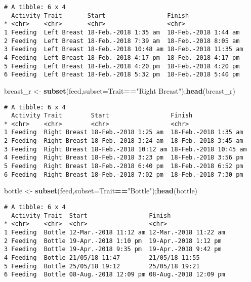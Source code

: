 \documentclass[10,portrait]{article}
\newenvironment{Shaded}{\begin{snugshade}}{\end{snugshade}}
\newcommand{\KeywordTok}[1]{\textcolor[rgb]{0.13,0.29,0.53}{\textbf{#1}}}
\newcommand{\DataTypeTok}[1]{\textcolor[rgb]{0.13,0.29,0.53}{#1}}
\newcommand{\StringTok}[1]{\textcolor[rgb]{0.31,0.60,0.02}{#1}}
\newcommand{\OperatorTok}[1]{\textcolor[rgb]{0.81,0.36,0.00}{\textbf{#1}}}
\newcommand{\NormalTok}[1]{#1}
\begin{document}
\begin{verbatim}
# A tibble: 6 x 4
  Activity Trait       Start                 Finish               
* <chr>    <chr>       <chr>                 <chr>                
1 Feeding  Left Breast 18-Feb.-2018 1:35 am  18-Feb.-2018 1:44 am 
2 Feeding  Left Breast 18-Feb.-2018 7:39 am  18-Feb.-2018 8:05 am 
3 Feeding  Left Breast 18-Feb.-2018 10:48 am 18-Feb.-2018 11:35 am
4 Feeding  Left Breast 18-Feb.-2018 4:17 pm  18-Feb.-2018 4:17 pm 
5 Feeding  Left Breast 18-Feb.-2018 4:20 pm  18-Feb.-2018 4:20 pm 
6 Feeding  Left Breast 18-Feb.-2018 5:32 pm  18-Feb.-2018 5:40 pm 
\end{verbatim}

\begin{Shaded}
\begin{Highlighting}[]
\NormalTok{breast_r <-}\StringTok{ }\KeywordTok{subset}\NormalTok{(feed,}\DataTypeTok{subset=}\NormalTok{Trait}\OperatorTok{==}\StringTok{"Right Breast"}\NormalTok{);}\KeywordTok{head}\NormalTok{(breast_r)}
\end{Highlighting}
\end{Shaded}

\begin{verbatim}
# A tibble: 6 x 4
  Activity Trait        Start                 Finish               
* <chr>    <chr>        <chr>                 <chr>                
1 Feeding  Right Breast 18-Feb.-2018 1:25 am  18-Feb.-2018 1:35 am 
2 Feeding  Right Breast 18-Feb.-2018 3:24 am  18-Feb.-2018 3:45 am 
3 Feeding  Right Breast 18-Feb.-2018 10:12 am 18-Feb.-2018 10:45 am
4 Feeding  Right Breast 18-Feb.-2018 3:23 pm  18-Feb.-2018 3:56 pm 
5 Feeding  Right Breast 18-Feb.-2018 6:40 pm  18-Feb.-2018 6:52 pm 
6 Feeding  Right Breast 18-Feb.-2018 7:02 pm  18-Feb.-2018 7:30 pm 
\end{verbatim}

\begin{Shaded}
\begin{Highlighting}[]
\NormalTok{bottle <-}\StringTok{ }\KeywordTok{subset}\NormalTok{(feed,}\DataTypeTok{subset=}\NormalTok{Trait}\OperatorTok{==}\StringTok{"Bottle"}\NormalTok{);}\KeywordTok{head}\NormalTok{(bottle)}
\end{Highlighting}
\end{Shaded}

\begin{verbatim}
# A tibble: 6 x 4
  Activity Trait  Start                 Finish               
* <chr>    <chr>  <chr>                 <chr>                
1 Feeding  Bottle 12-Mar.-2018 11:12 am 12-Mar.-2018 11:22 am
2 Feeding  Bottle 19-Apr.-2018 1:10 pm  19-Apr.-2018 1:12 pm 
3 Feeding  Bottle 19-Apr.-2018 9:35 pm  19-Apr.-2018 9:42 pm 
4 Feeding  Bottle 21/05/18 11:47        21/05/18 11:55       
5 Feeding  Bottle 25/05/18 19:12        25/05/18 19:21       
6 Feeding  Bottle 08-Aug.-2018 12:09 pm 08-Aug.-2018 12:09 pm
\end{verbatim}
\end{document}
